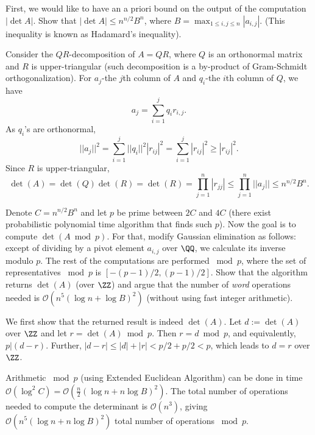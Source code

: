 \documentclass[11pt]{exam}
\theoremstyle{definition}
\begin{document}
\begin{questions}
	\question First, we would like to have an a priori bound on the output of the computation $|\det A|$. Show that $|\det A| \leq n^{n/2}B^n$, where $B = \max_{1 \leq i,j \leq n} |a_{i,j}|$. (This inequality is known as Hadamard's inequality).
	\begin{solution}
		Consider the $QR$-decomposition of $A = QR$, where $Q$ is an orthonormal matrix and $R$ is upper-triangular (such decomposition is a by-product of Gram-Schmidt orthogonalization). For $a_j$-the $j$th column of $A$ and $q_i$-the $i$th column of $Q$, we have
		\[
			a_j = \sum_{i=1}^j q_i r_{i,j}.
		\]
		As $q_i$'s are orthonormal, 
		\[
		||a_j||^2 = \sum_{i=1}^{j} ||q_i||^2 |r_{ij}|^2 = \sum_{i=1}^{j} |r_{ij}|^2 \geq |r_{ij}|^2.
		\]
		Since $R$ is upper-triangular,
		\[
			\det(A) = \det(Q)\det(R) = \det(R) = \prod_{j=1}^n |r_{jj}| \leq \prod_{j=1}^n ||a_j|| \leq n^{n/2}B^n.
		\]
	\end{solution}  
	\question Denote $C = n^{n/2}B^n$ and let $p$ be prime between $2C$ and $4C$ (there exist probabilistic polynomial time algorithm that finds such $p$). Now the goal is to compute $\det (A \bmod p)$. For that, modify Gaussian elimination as follows: except of dividing by a pivot element $a_{i,j}$ over $\QQ$, we calculate its inverse modulo $p$. The rest of the computations are performed $\bmod p$, where the set of representatives $\bmod p$ is $[-(p-1)/2, (p-1)/2]$. Show that the algorithm returns $\det(A)$ (over $\ZZ$) and argue that the number of \emph{word} operations needed is $\mathcal{O}(n^5 (\log n + \log B)^2)$ (without using fast integer arithmetic).
	\begin{solution}
		We first show that the returned result is indeed $\det(A)$. Let $d := \det(A)$ over $\ZZ$ and let $r = \det(A) \bmod p$. Then $r = d \bmod p$, and equivalently, $p | (d - r)$. Further, $|d-r| \leq |d| + |r| < p/2 + p/2 < p$, which leads to $d=r$ over $\ZZ$.
		
		Arithmetic $\bmod p$ (using Extended Euclidean Algorithm) can be done in time $\mathcal{O}(\log^2 C) = \mathcal{O}\left( \frac{n}{2}(\log n + n \log B)^2\right)$. The total number of operations needed to compute the determinant is $\mathcal{O}(n^3)$, giving $\mathcal{O}(n^5(\log n + n \log B)^2)$ total number of operations $\bmod p$.  
	\end{solution}


\end{questions}
\end{document}
